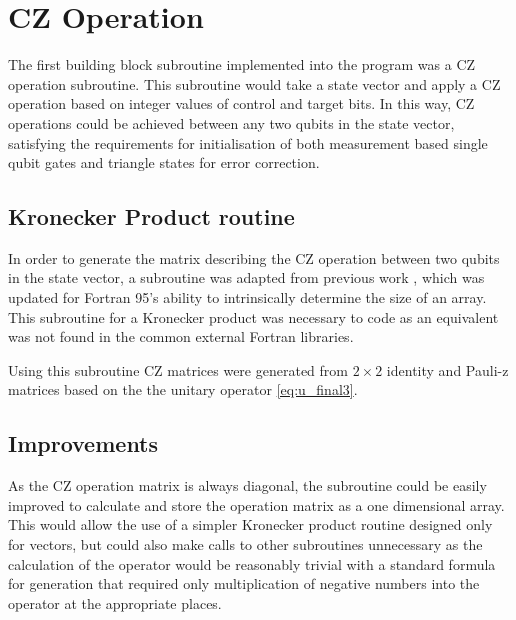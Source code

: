 
\section{CZ Operation}

The first building block subroutine implemented into the program was a CZ operation subroutine. This subroutine would take a state vector and apply a CZ operation based on integer values of control and target bits. In this way, CZ operations could be achieved between any two qubits in the state vector, satisfying the requirements for initialisation of both measurement based single qubit gates and triangle states for error correction.


\subsection{Kronecker Product routine}

In order to generate the matrix describing the CZ operation between two qubits in the state vector, a subroutine was adapted from previous work \citep{children_spin_2013}, which was updated for Fortran 95's ability to intrinsically determine the size of an array. This subroutine for a Kronecker product was necessary to code as an equivalent was not found in the common external Fortran libraries. 

Using this subroutine CZ matrices were generated from $2 \times 2$ identity and Pauli-z matrices based on the the unitary operator \eqref{eq:u_final3}. 




\subsection{Improvements}
As the CZ operation matrix is always diagonal, the subroutine could be easily improved to calculate and store the operation matrix as a one dimensional array. This would allow the use of a simpler Kronecker product routine designed only for vectors, but could also make calls to other subroutines unnecessary as the calculation of the operator would be reasonably trivial with a standard formula for generation that required only multiplication of negative numbers into the operator at the appropriate places.


